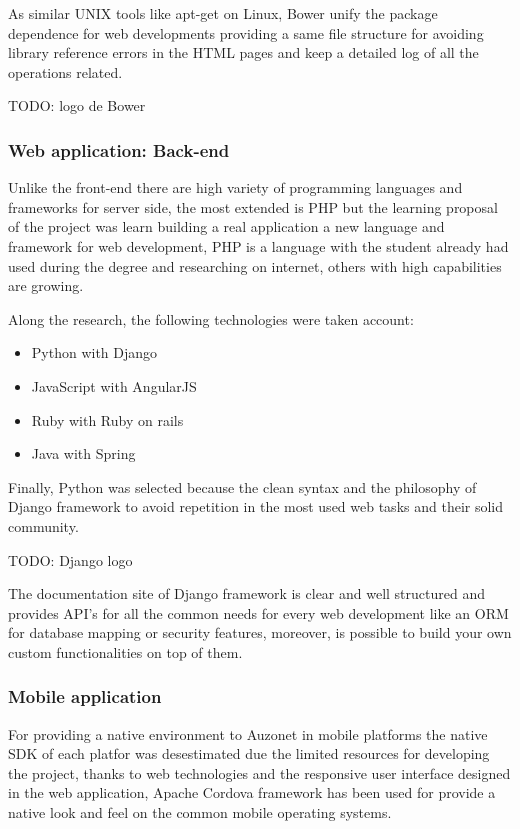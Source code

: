 \documentclass{DeustoFDP}
\begin{document}
As similar UNIX tools like apt-get on Linux, Bower unify the package dependence for web developments providing a same file structure for avoiding library reference errors in the HTML pages and keep a detailed log of all the operations related.

TODO: logo de Bower

\subsubsection{Web application: Back-end}
Unlike the front-end there are high variety of programming languages and frameworks for server side, the most extended is PHP but the learning proposal of the project was learn building a real application a new language and framework for web development, PHP is a language with the student already had used during the degree and researching on internet, others with high capabilities are growing.

Along the research, the following technologies were taken account:
\begin{itemize}
	\item Python with Django
	\item JavaScript with AngularJS
	\item Ruby with Ruby on rails
	\item Java with Spring
\end{itemize}

Finally, Python was selected because the clean syntax and the philosophy of Django framework to avoid repetition in the most used web tasks and their solid community.

TODO: Django logo

The documentation site of Django framework is clear and well structured and provides API's for all the common needs for every web development like an ORM for database mapping or security features, moreover, is possible to build your own custom functionalities on top of them.

\subsubsection{Mobile application}
For providing a native environment to Auzonet in mobile platforms the native SDK of each platfor was desestimated due the limited resources for developing the project, thanks to web technologies and the responsive user interface designed in the web application, Apache Cordova framework has been used for provide a native look and feel on the common mobile operating systems.
\end{document}
